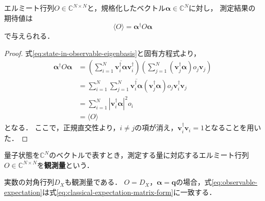 \begin{prop}[期待値の行列表現]
  \label{prop:observable-expectation}
  エルミート行列$O\in\mathbb C^{N\times N}$と，規格化したベクトル$\bm{\alpha}\in\mathbb C^N$に対し，
  測定結果の期待値は
  \begin{equation}
    \langle O\rangle=\bm{\alpha}^{\dagger}O\bm{\alpha}
    \label{eq:observable-expectation}
  \end{equation}
  で与えられる．
\end{prop}
\begin{proof}
  式\eqref{eq:state-in-observable-eigenbasis}と固有方程式より，
  \begin{equation*}
    \begin{aligned}
      \bm{\alpha}^{\dagger}O\bm{\alpha}
       & =\left(\sum_{i=1}^{N}\overline{\bm{v}_i^{\dagger}\bm{\alpha}}\bm{v}_i^{\dagger}\right)
      \left(\sum_{j=1}^{N}(\bm{v}_j^{\dagger}\bm{\alpha}) o_j\bm{v}_j\right)                                \\
       & =\sum_{i=1}^{N}\sum_{j=1}^{N}
      \overline{\bm{v}_i^{\dagger}\bm{\alpha}}(\bm{v}_j^{\dagger}\bm{\alpha}) o_j\bm{v}_i^{\dagger}\bm{v}_j \\
       & =\sum_{i=1}^{N}|\bm{v}_i^{\dagger}\bm{\alpha}|^2o_i                                                \\
       & =\langle O\rangle
    \end{aligned}
  \end{equation*}
  となる．
  ここで，正規直交性より，$i\ne j$の項が消え，$\bm{v}_i^{\dagger}\bm{v}_i=1$となることを用いた．
\end{proof}

\begin{defi}[観測量]
  \label{def:observable}
  量子状態を$\mathbb C^N$のベクトルで表すとき，測定する量に対応するエルミート行列$O\in\mathbb C^{N\times N}$を\textbf{観測量}という．
\end{defi}

実数の対角行列$D_X$も観測量である．
$O=D_X$，$\bm{\alpha}=\bm{q}$の場合，式\eqref{eq:observable-expectation}は式\eqref{eq:classical-expectation-matrix-form}に一致する．


